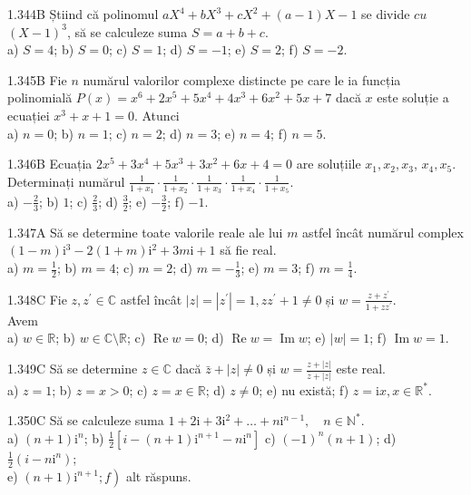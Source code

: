 \documentclass[11pt]{article}
\begin{document}
1.344B Știind că polinomul $a X^{4}+b X^{3}+c X^{2}+(a-1) X-1$ se divide $c u$ $(X-1)^{3}$, să se calculeze suma $S=a+b+c$.\\ a) $S=4$; b) $S=0$; c) $S=1$; d) $S=-1$; e) $S=2$; f) $S=-2$.

1.345B Fie $n$ numărul valorilor complexe distincte pe care le ia funcția polinomială $P(x)=x^{6}+2 x^{5}+5 x^{4}+4 x^{3}+6 x^{2}+5 x+7$ dacă $x$ este soluție a ecuației $x^{3}+x+1=0$. Atunci\\ a) $n=0$; b) $n=1$; c) $n=2$; d) $n=3$; e) $n=4$; f) $n=5$.

1.346B Ecuația $2 x^{5}+3 x^{4}+5 x^{3}+3 x^{2}+6 x+4=0$ are soluțiile $x_{1}, x_{2}, x_{3}$, $x_{4}, x_{5}$. Determinați numărul $\frac{1}{1+x_{1}} \cdot \frac{1}{1+x_{2}} \cdot \frac{1}{1+x_{3}} \cdot \frac{1}{1+x_{4}} \cdot \frac{1}{1+x_{5}}$.\\ a) $-\frac{2}{3}$; b) $1$; c) $\frac{2}{3}$; d) $\frac{3}{2}$; e) $-\frac{3}{2}$; f) $-1$.

1.347A Să se determine toate valorile reale ale lui $m$ astfel încât numărul complex $(1-m) \mathrm{i}^{3}-2(1+m) \mathrm{i}^{2}+3 m \mathrm{i}+1$ să fie real.\\ a) $m=\frac{1}{2}$; b) $m=4$; c) $m=2$; d) $m=-\frac{1}{3}$; e) $m=3$; f) $m=\frac{1}{4}$.

1.348C Fie $z, z^{\prime} \in \mathbb{C}$ astfel încât $|z|=\left|z^{\prime}\right|=1, z z^{\prime}+1 \neq 0$ și $w=\frac{z+z^{\prime}}{1+z z^{\prime}}$.\\Avem\\ a) $w \in \mathbb{R}$; b) $w \in \mathbb{C} \setminus \mathbb{R}$; c) $\operatorname{Re} w=0$; d) $\operatorname{Re} w=\operatorname{Im} w$; e) $|w|=1$; f) $\operatorname{Im} w=1$.

1.349C Să se determine $z \in \mathbb{C}$ dacă $\bar{z}+|z| \neq 0$ și $w=\frac{z+|z|}{\bar{z}+|z|}$ este real.\\ a) $z=1$; b) $z=x>0$; c) $z=x \in \mathbb{R}$; d) $z \neq 0$; e) nu există; f) $z=\mathrm{i} x, x \in \mathbb{R}^{*}$.

1.350C Să se calculeze suma $1+2 \mathrm{i}+3 \mathrm{i}^{2}+\ldots+n \mathrm{i}^{n-1}, \quad n \in \mathbb{N}^{*}$.\\ a) $(n+1) \mathrm{i}^{n}$; b) $\frac{1}{2}\left[i-(n+1) \mathrm{i}^{n+1}-n \mathrm{i}^{n}\right]$ c) $(-1)^{n}(n+1)$; d) $\frac{1}{2}\left(i-n \mathrm{i}^{n}\right)$;\\ e) $\left.(n+1) \mathrm{i}^{n+1} ; f\right)$ alt răspuns.
\end{document}
